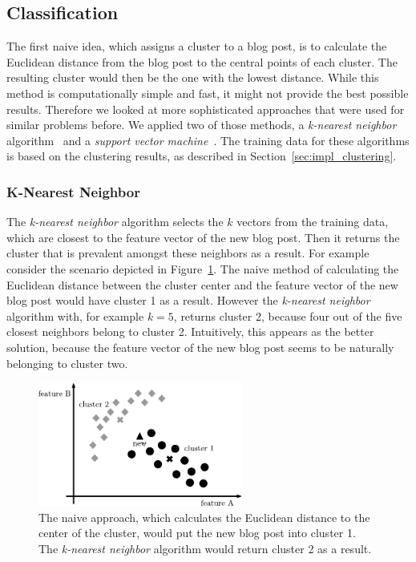 \subsection{Classification}
\label{sec:impl_classification}


The first naive idea, which assigns a cluster to a blog post, is to calculate the Euclidean distance from the blog post to the central points of each cluster.
The resulting cluster would then be the one with the lowest distance.
While this method is computationally simple and fast, it might not provide the best possible results.
Therefore we looked at more sophisticated approaches that were used for similar problems before.
We applied two of those methods, a \textit{k-nearest neighbor} algorithm~\cite{peterson2009k} and a \textit{support vector machine}~\cite{kolari2006svms}.
The training data for these algorithms is based on the clustering results, as described in Section~\ref{sec:impl_clustering}.


\subsubsection{K-Nearest Neighbor}
\label{sec:k_nearest_neighbor}


The \textit{k-nearest neighbor} algorithm selects the $k$ vectors from the training data, which are closest to the feature vector of the new blog post.
Then it returns the cluster that is prevalent amongst these neighbors as a result.
For example consider the scenario depicted in Figure~\ref{fig:naive}.
The naive method of calculating the Euclidean distance between the cluster center and the feature vector of the new blog post would have cluster 1 as a result.
However the \textit{k-nearest neighbor} algorithm with, for example $k=5$, returns cluster 2, because four out of the five closest neighbors belong to cluster 2.
Intuitively, this appears as the better solution, because the feature vector of the new blog post seems to be naturally belonging to cluster two.


\begin{figure}[ht!]
    \centering
    \includegraphics[width=0.6\textwidth]{images/naive.pdf}
    \caption{The naive approach, which calculates the Euclidean distance to the center of the cluster, would put the new blog post into cluster 1. The \textit{k-nearest neighbor} algorithm would return cluster 2 as a result.}
    \label{fig:naive}
\end{figure}


